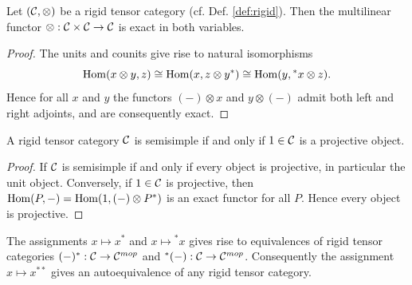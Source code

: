 \documentclass{amsart}
\begin{document}
%
%



\begin{lemma} \label{lma:RigidIsExact}
	Let $(\mathcal C, \otimes)$ be a rigid tensor category (cf. Def. \ref{def:rigid}). Then the multilinear functor $\otimes: \mathcal C \times \mathcal C \to \mathcal C$ is exact in both variables. 
\end{lemma}

\begin{proof}
	The units and counits give rise to natural isomorphisms %
 \begin{equation*} 
 	\operatorname{Hom}(x \otimes y, z) \cong \operatorname{Hom}( x, z \otimes y^*) \cong \operatorname{Hom}(y, {}^*x \otimes z).
 \end{equation*}
	Hence for all $x$ and $y$ the functors $(-)\otimes x$ and $y \otimes (-)$ admit both left and right adjoints, and are consequently exact. 
\end{proof}

\begin{corollary}
	A rigid tensor category $\mathcal C$ is semisimple if and only if $1 \in \mathcal C$ is a projective object. 
\end{corollary}

\begin{proof}
	If $\mathcal C$ is semisimple if and only if every object is projective, in particular the unit object. Conversely, if $1 \in \mathcal C$ is projective, then $\operatorname{Hom}(P, -) = \operatorname{Hom}( 1, (-) \otimes P^*)$ is an exact functor for all $P$. Hence every object is projective.  
\end{proof}

\begin{lemma}
	The assignments $x \mapsto x^*$ and $x \mapsto {}^*x$ gives rise to equivalences of rigid tensor categories $(-)^*: \mathcal C \to \mathcal C^{mop}$ and ${}^*(-): \mathcal C \to \mathcal C^{mop}$. Consequently the assignment $x \mapsto x^{**}$ gives an autoequivalence of any rigid tensor category. 
\end{lemma}

\end{document}

